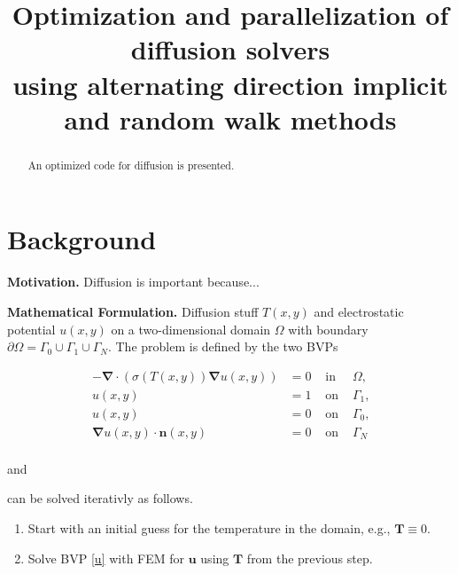\documentclass[letterpaper]{article}
\title{Optimization and parallelization of diffusion solvers\\
using alternating direction implicit and random walk methods}
\newcommand{\mypar}[1]{{\bf #1.}}
\begin{document}
%
\maketitle
%


\begin{abstract}
An optimized code for diffusion is presented. 
\end{abstract}


\section{Background}\label{sec:background}

\mypar{Motivation} 
Diffusion is important because...

\mypar{Mathematical Formulation}
Diffusion stuff $T(x,y)$ and electrostatic potential $u(x,y)$ on a two-dimensional domain $\Omega$ with boundary $\partial \Omega = \Gamma_0 \cup \Gamma_1 \cup \Gamma_N$. The problem is defined by the two BVPs

\begin{equation}
\begin{aligned}
-\mathbf{\nabla} \cdot (\sigma(T(x,y)) \mathbf{\nabla} u(x,y)) &= 0 & \text{ \ in \ } & \Omega \text{,} \\
u(x,y) &= 1 & \text{ \ on \ } & \Gamma_1 \text{,} \\
u(x,y) &= 0 & \text{ \ on \ } & \Gamma_0 \text{,}  \\
\mathbf{\nabla} u(x,y) \cdot \mathbf{n}(x,y) &= 0 & \text{ \ on \ } & \Gamma_N \\
\end{aligned}
\label{u}
\end{equation}

\begin{center}
and
\end{center}

can be solved iterativly as follows.
\begin{enumerate}[noitemsep]
\item Start with an initial guess for the temperature in the domain, e.g., $\mathbf{T} \equiv 0$. 
\item Solve BVP \eqref{u} with FEM for $\mathbf{u}$ using $\mathbf{T}$ from the previous step.
\end{enumerate}


\end{document}
